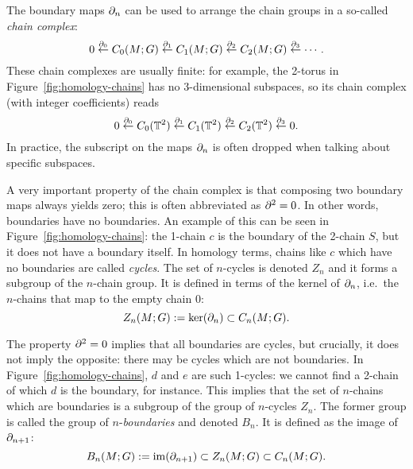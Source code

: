 The boundary maps $\partial_n$ can be used to arrange the chain groups in a so-called \emph{chain complex}:
\begin{equation*}
	0 \overset{\partial_0}{\leftarrow} C_0(M;G) \overset{\partial_1}{\leftarrow} C_1(M;G) \overset{\partial_2}{\leftarrow} C_2(M;G) \overset{\partial_3}{\leftarrow} \cdots.
\end{equation*}
These chain complexes are usually finite: for example, the 2-torus in Figure~\ref{fig:homology-chains} has no 3-dimensional subspaces, so its chain complex (with integer coefficients) reads
\begin{equation*}
	0 \overset{\partial_0}{\leftarrow} C_0(\mathbb{T}^2) \overset{\partial_1}{\leftarrow} C_1(\mathbb{T}^2) \overset{\partial_2}{\leftarrow} C_2(\mathbb{T}^2) \overset{\partial_3}{\leftarrow} 0.
\end{equation*}
In practice, the subscript on the maps $\partial_n$ is often dropped when talking about specific subspaces.

A very important property of the chain complex is that composing two boundary maps always yields zero; this is often abbreviated as $\partial^2 = 0$. In other words, boundaries have no boundaries. An example of this can be seen in Figure~\ref{fig:homology-chains}: the 1-chain $c$ is the boundary of the 2-chain $S$, but it does not have a boundary itself. In homology terms, chains like $c$ which have no boundaries are called \emph{cycles}. The set of $n$-cycles is denoted $Z_n$ and it forms a subgroup of the $n$-chain group. It is defined in terms of the kernel of $\partial_n$, i.e.\ the $n$-chains that map to the empty chain 0:
\begin{equation*}
	Z_n(M;G) := \ker(\partial_n) \subset C_n(M;G).
\end{equation*}

The property $\partial^2 = 0$ implies that all boundaries are cycles, but crucially, it does not imply the opposite: there may be cycles which are not boundaries. In Figure~\ref{fig:homology-chains}, $d$ and $e$ are such 1-cycles: we cannot find a 2-chain of which $d$ is the boundary, for instance. This implies that the set of $n$-chains which are boundaries is a subgroup of the group of $n$-cycles $Z_n$. The former group is called the group of $n$-\emph{boundaries} and denoted $B_n$. It is defined as the image of $\partial_{n+1}$:
\begin{equation*}
	B_n(M;G) := \operatorname{im}(\partial_{n+1}) \subset Z_n(M;G) \subset C_n(M;G).
\end{equation*}

